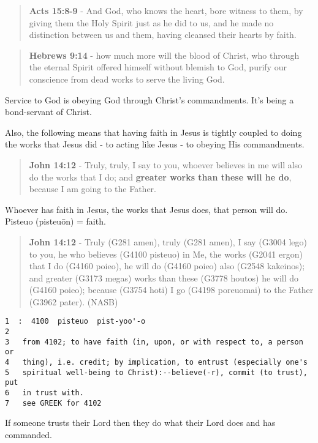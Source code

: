 \documentclass[11pt]{article}
\begin{document}
\begin{quote}
\textbf{Acts 15:8-9} - And God, who knows the heart, bore witness to them, by giving them the Holy Spirit just as he did to us, and he made no distinction between us and them, having cleansed their hearts by faith.
\end{quote}

\begin{quote}
\textbf{Hebrews 9:14} - how much more will the blood of Christ, who through the eternal Spirit offered himself without blemish to God, purify our conscience from dead works to serve the living God.
\end{quote}

Service to God is obeying God through Christ's commandments. It's being a bond-servant of Christ.

Also, the following means that having faith in Jesus is tightly coupled to doing the works that Jesus did - to acting like Jesus - to obeying His commandments.

\begin{quote}
\textbf{John 14:12} - Truly, truly, I say to you, whoever believes in me will also do the works that I do; and \textbf{greater works than these will he do}, because I am going to the Father.
\end{quote}

Whoever has faith in Jesus, the works that Jesus does, that person will do.
Pisteuo (pisteuōn) = faith.

\begin{quote}
\textbf{John 14:12} - Truly (G281 amen), truly (G281 amen), I say (G3004 lego) to you, he who believes (G4100 pisteuo) in Me, the works (G2041 ergon) that I do (G4160 poieo), he will do (G4160 poieo) also (G2548 kakeinos); and greater (G3173 megas) works than these (G3778 houtos) he will do (G4160 poieo); because (G3754 hoti) I go (G4198 poreuomai) to the Father (G3962 pater). (NASB)
\end{quote}

\begin{verbatim}
1  :  4100  pisteuo  pist-yoo'-o
2  
3   from 4102; to have faith (in, upon, or with respect to, a person or
4   thing), i.e. credit; by implication, to entrust (especially one's
5   spiritual well-being to Christ):--believe(-r), commit (to trust), put
6   in trust with.
7   see GREEK for 4102
\end{verbatim}

If someone trusts their Lord then they do what their Lord does and has commanded.
\end{document}
